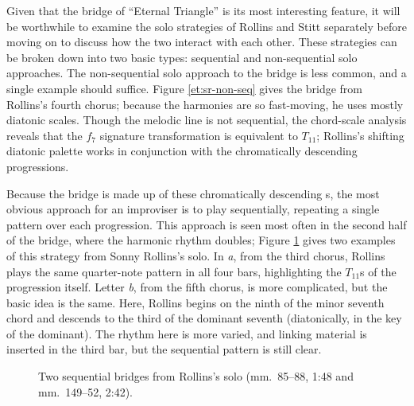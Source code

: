 Given that the bridge of ``Eternal Triangle'' is its most interesting feature,
it will be worthwhile to examine the solo strategies of Rollins and Stitt
separately before moving on to discuss how the two interact with each other.
These strategies can be broken down into two basic types: sequential and
non-sequential solo approaches. The non-sequential solo approach to the bridge
is less common, and a single example should suffice. Figure
\ref{et:sr-non-seq} gives the bridge from Rollins's fourth chorus;
because the harmonies are so fast-moving, he uses mostly diatonic scales.
Though the melodic line is not sequential, the chord-scale analysis reveals
that the $f_7$ signature transformation is equivalent to $T_{11}$; Rollins's
shifting diatonic palette works in conjunction with the chromatically
descending \tf progressions.

Because the bridge is made up of these chromatically descending \tf{}s, the most
obvious approach for an improviser is to play sequentially, repeating a single
pattern over each \tf progression. This approach is seen most often in the
second half of the bridge, where the harmonic rhythm doubles; Figure
\ref{et:sr-seq-bridge} gives two examples of this strategy from Sonny Rollins's
solo. In \emph{a}, from the third chorus, Rollins plays the same
quarter-note pattern in all four bars, highlighting the $T_{11}$s of the
progression itself. Letter \emph{b}, from the fifth chorus, is
more complicated, but the basic idea is the same. Here, Rollins begins on the
ninth of the minor seventh chord and descends to the third of the dominant
seventh (diatonically, in the key of the dominant). The rhythm here is more
varied, and linking material is inserted in the third bar, but the sequential
pattern is still clear.

\begin{figure}[tbp]
  \caption[Two sequential bridges from Rollins's solo.]{%
    Two sequential bridges from Rollins's solo (mm.~85--88, 1:48 and
    mm.~149--52, 2:42).}
  \label{et:sr-seq-bridge}
\end{figure}

